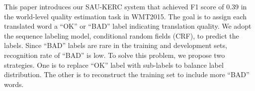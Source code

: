 This paper introduces our SAU-KERC system that achieved F1 score of 0.39 in the world-level quality estimation task in WMT2015. The goal is to assign each translated word a ``OK'' or ``BAD'' label indicating translation quality. We adopt the sequence labeling model, conditional random fields (CRF), to predict the labels. Since ``BAD'' labels are rare in the training and development sets, recognition rate of ``BAD'' is low. To solve this problem, we propose two strategies. One is to replace ``OK'' label with sub-labels to balance label distribution. The other is to reconstruct the training set to include more ``BAD'' words.
